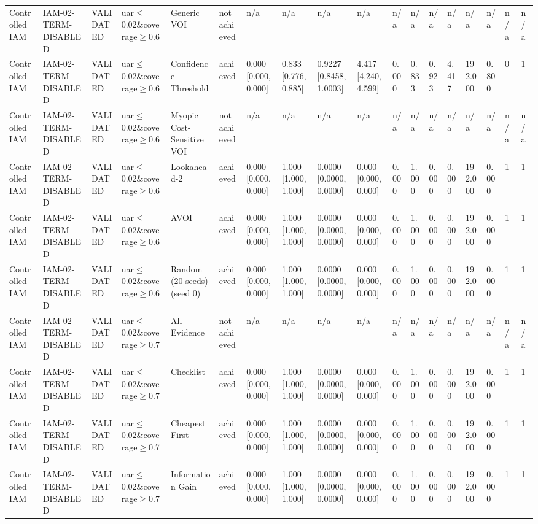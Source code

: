 \begin{table}[!ht]
{\begin{tabular}{llllllllllllllllll}
Controlled IAM & IAM-02-TERM-DISABLED & VALIDATED & uar$\le$0.02\&coverage$\ge$0.6 & Generic VOI & not achieved & n/a & n/a & n/a & n/a & n/a & n/a & n/a & n/a & n/a & n/a & n/a & n/a \\
Controlled IAM & IAM-02-TERM-DISABLED & VALIDATED & uar$\le$0.02\&coverage$\ge$0.6 & Confidence Threshold & achieved & 0.000 [0.000, 0.000] & 0.833 [0.776, 0.885] & 0.9227 [0.8458, 1.0003] & 4.417 [4.240, 4.599] & 0.000 & 0.833 & 0.923 & 4.417 & 192.000 & 0.800 & 0 & 1 \\
Controlled IAM & IAM-02-TERM-DISABLED & VALIDATED & uar$\le$0.02\&coverage$\ge$0.6 & Myopic Cost-Sensitive VOI & not achieved & n/a & n/a & n/a & n/a & n/a & n/a & n/a & n/a & n/a & n/a & n/a & n/a \\
Controlled IAM & IAM-02-TERM-DISABLED & VALIDATED & uar$\le$0.02\&coverage$\ge$0.6 & Lookahead-2 & achieved & 0.000 [0.000, 0.000] & 1.000 [1.000, 1.000] & 0.0000 [0.0000, 0.0000] & 0.000 [0.000, 0.000] & 0.000 & 1.000 & 0.000 & 0.000 & 192.000 & 0.000 & 1 & 1 \\
Controlled IAM & IAM-02-TERM-DISABLED & VALIDATED & uar$\le$0.02\&coverage$\ge$0.6 & AVOI & achieved & 0.000 [0.000, 0.000] & 1.000 [1.000, 1.000] & 0.0000 [0.0000, 0.0000] & 0.000 [0.000, 0.000] & 0.000 & 1.000 & 0.000 & 0.000 & 192.000 & 0.000 & 1 & 1 \\
Controlled IAM & IAM-02-TERM-DISABLED & VALIDATED & uar$\le$0.02\&coverage$\ge$0.6 & Random (20 seeds) (seed 0) & achieved & 0.000 [0.000, 0.000] & 1.000 [1.000, 1.000] & 0.0000 [0.0000, 0.0000] & 0.000 [0.000, 0.000] & 0.000 & 1.000 & 0.000 & 0.000 & 192.000 & 0.000 & 1 & 1 \\
Controlled IAM & IAM-02-TERM-DISABLED & VALIDATED & uar$\le$0.02\&coverage$\ge$0.7 & All Evidence & not achieved & n/a & n/a & n/a & n/a & n/a & n/a & n/a & n/a & n/a & n/a & n/a & n/a \\
Controlled IAM & IAM-02-TERM-DISABLED & VALIDATED & uar$\le$0.02\&coverage$\ge$0.7 & Checklist & achieved & 0.000 [0.000, 0.000] & 1.000 [1.000, 1.000] & 0.0000 [0.0000, 0.0000] & 0.000 [0.000, 0.000] & 0.000 & 1.000 & 0.000 & 0.000 & 192.000 & 0.000 & 1 & 1 \\
Controlled IAM & IAM-02-TERM-DISABLED & VALIDATED & uar$\le$0.02\&coverage$\ge$0.7 & Cheapest First & achieved & 0.000 [0.000, 0.000] & 1.000 [1.000, 1.000] & 0.0000 [0.0000, 0.0000] & 0.000 [0.000, 0.000] & 0.000 & 1.000 & 0.000 & 0.000 & 192.000 & 0.000 & 1 & 1 \\
Controlled IAM & IAM-02-TERM-DISABLED & VALIDATED & uar$\le$0.02\&coverage$\ge$0.7 & Information Gain & achieved & 0.000 [0.000, 0.000] & 1.000 [1.000, 1.000] & 0.0000 [0.0000, 0.0000] & 0.000 [0.000, 0.000] & 0.000 & 1.000 & 0.000 & 0.000 & 192.000 & 0.000 & 1 & 1 \\

\end{tabular}}
\end{table}
